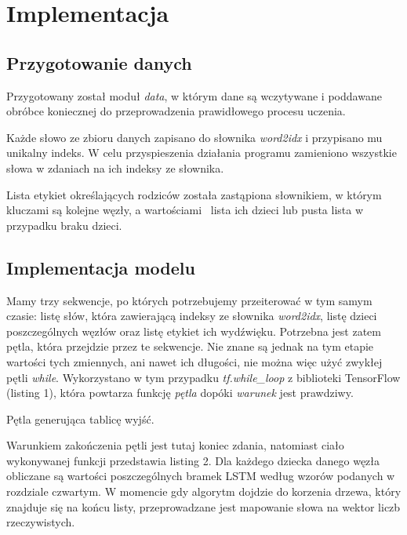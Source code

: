 \chapter{Implementacja}
\label{cha:implementacja}

\section{Przygotowanie danych}
\label{cha:przygotowanie}

Przygotowany został moduł \textit{data}, w którym dane są wczytywane i poddawane obróbce koniecznej do przeprowadzenia prawidłowego procesu uczenia. 

Każde słowo ze zbioru danych zapisano do słownika \textit{word2idx} i przypisano mu unikalny indeks. W celu przyspieszenia działania programu zamieniono wszystkie słowa w zdaniach na ich indeksy ze słownika. 

Lista etykiet określających rodziców została zastąpiona słownikiem, w którym kluczami są kolejne węzły, a wartościami \textendash \ lista ich dzieci lub pusta lista w przypadku braku dzieci. 

\section{Implementacja modelu}
\label{cha:implementacjamodelu}

Mamy trzy sekwencje, po których potrzebujemy przeiterować w tym samym czasie: listę słów, która zawierającą indeksy ze słownika \textit{word2idx}, listę dzieci poszczególnych węzłów oraz listę etykiet ich wydźwięku. Potrzebna jest zatem pętla, która przejdzie przez te sekwencje. Nie znane są jednak na tym etapie wartości tych zmiennych, ani nawet ich długości, nie można więc użyć zwykłej pętli \textit{while}. Wykorzystano w tym przypadku \textit{tf.while\_loop} z biblioteki TensorFlow (listing 1), która powtarza funkcję \textit{pętla} dopóki \textit{warunek} jest prawdziwy. 

\begin{listing}[]

\caption{Pętla generująca tablicę wyjść.}
\end{listing}

Warunkiem zakończenia pętli jest tutaj koniec zdania, natomiast ciało wykonywanej funkcji przedstawia listing 2. Dla każdego dziecka danego węzła obliczane są wartości poszczególnych bramek LSTM według wzorów podanych w rozdziale czwartym. W momencie gdy algorytm dojdzie do korzenia drzewa, który znajduje się na końcu listy, przeprowadzane jest mapowanie słowa na wektor liczb rzeczywistych. 
\\

